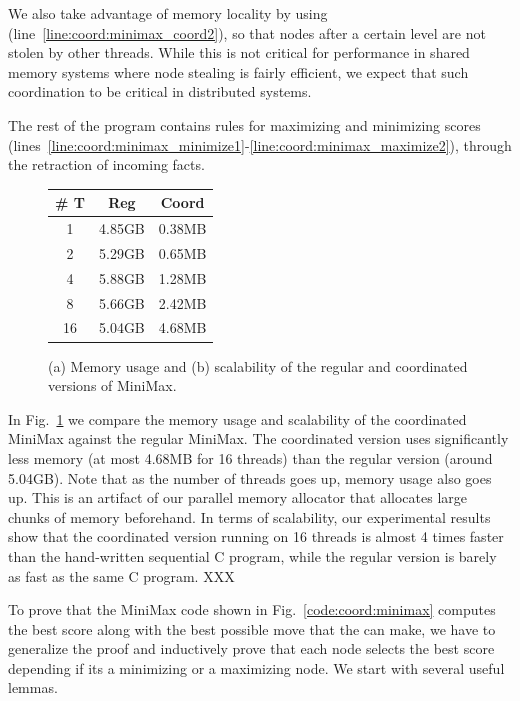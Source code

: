 We also take advantage of memory locality by using 
(line~\ref{line:coord:minimax_coord2}), so that nodes after a certain level are
   not stolen by other threads. While this is not critical for performance in
   shared memory systems where node stealing is fairly efficient, we expect that
   such coordination to be critical in distributed systems.

The rest of the program contains rules for maximizing and minimizing scores
(lines~\ref{line:coord:minimax_minimize1}-\ref{line:coord:minimax_maximize2}),
through the retraction of  incoming facts.

\begin{figure}[ht]
   \begin{center}
      \begin{tabular}[b]{ | c | c | c |}
         \hline
         \textbf{\# T} & \textbf{Reg} & \textbf{Coord} \\ \hline \hline
         1 & 4.85GB & 0.38MB \\ \hline
         2 & 5.29GB & 0.65MB \\ \hline
         4 & 5.88GB & 1.28MB \\ \hline
         8 & 5.66GB & 2.42MB \\ \hline
         16 & 5.04GB & 4.68MB \\ \hline
         \end{tabular}
   \end{center}

   \caption{(a) Memory usage and (b) scalability of the regular and coordinated
versions of MiniMax.}
   \label{results:memory_minmax}
\end{figure}

In Fig.~\ref{results:memory_minmax} we compare the memory usage and scalability
of the coordinated MiniMax against the regular MiniMax. The coordinated version
uses significantly less memory (at most 4.68MB for 16 threads) than the regular
version (around 5.04GB). Note that as the number of threads goes up, memory
usage also goes up. This is an artifact of our parallel memory allocator that
allocates large chunks of memory beforehand. In terms of scalability, our
experimental results show that the coordinated version running on 16 threads is
almost 4 times faster than the hand-written sequential C program, while the
regular version is barely as fast as the same C program. XXX

To prove that the MiniMax code shown in Fig.~\ref{code:coord:minimax} computes
the best score along with the best possible move that the  can
make, we have to generalize the proof and inductively prove that each node
selects the best score depending if its a minimizing or a maximizing node. We
start with several useful lemmas.


